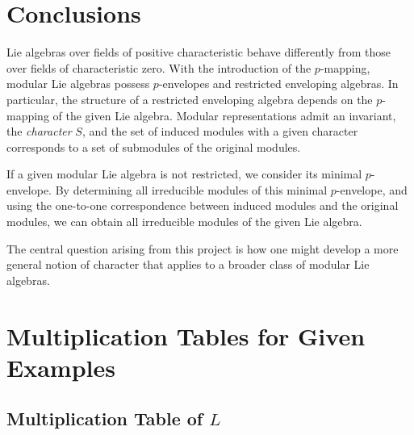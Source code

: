 \documentclass[12pt,MSc]{muthesis_2023}
\theoremstyle{plain}%
\theoremstyle{definition}
\theoremstyle{remark}
\DeclareMathOperator{\Sl}{\mathfrak{sl}}
\begin{document}
\chapter{Conclusions}


Lie algebras over fields of positive characteristic behave differently from those over fields of characteristic zero. With the introduction of the $p$-mapping, modular Lie algebras possess $p$-envelopes and restricted enveloping algebras. In particular, the structure of a restricted enveloping algebra depends on the $p$-mapping of the given Lie algebra. Modular representations admit an invariant, the \emph{character} $S$, and the set of induced modules with a given character corresponds to a set of submodules of the original modules.

If a given modular Lie algebra is not restricted, we consider its minimal $p$-envelope. By determining all irreducible modules of this minimal $p$-envelope, and using the one-to-one correspondence between induced modules and the original modules, we can obtain all irreducible modules of the given Lie algebra.

The central question arising from this project is how one might develop a more general notion of character that applies to a broader class of modular Lie algebras.




{}


\appendix

\chapter{Multiplication Tables for Given Examples}


\section{Multiplication Table of $L$}\label{chartabofC3}

\begin{table}[h]
\centering
{}
\caption{$\Sl(2,F)$}
\end{table}
\end{document}
